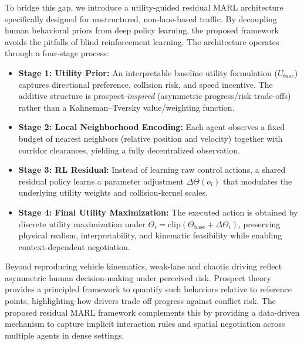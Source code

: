 \documentclass[conference]{IEEEtran}
\begin{document}
To bridge this gap, we introduce a utility-guided residual MARL architecture specifically designed for unstructured, non-lane-based traffic. By decoupling human behavioral priors from deep policy learning, the proposed framework avoids the pitfalls of blind reinforcement learning. The architecture operates through a four-stage process:

\begin{itemize}
    \item \textbf{Stage 1: Utility Prior:} An interpretable baseline utility formulation ($U_{base}$) captures directional preference, collision risk, and speed incentive. The additive structure is prospect-\emph{inspired} (asymmetric progress/risk trade-offs) rather than a Kahneman--Tversky value/weighting function.
    \item \textbf{Stage 2: Local Neighborhood Encoding:} Each agent observes a fixed budget of nearest neighbors (relative position and velocity) together with corridor clearances, yielding a fully decentralized observation.
    \item \textbf{Stage 3: RL Residual:} Instead of learning raw control actions, a shared residual policy learns a parameter adjustment $\Delta\Theta(o_{i})$ that modulates the underlying utility weights and collision-kernel scales.
    \item \textbf{Stage 4: Final Utility Maximization:} The executed action is obtained by discrete utility maximization under $\Theta_{i}=\mathrm{clip}(\Theta_{\mathrm{base}}+\Delta\Theta_{i})$, preserving physical realism, interpretability, and kinematic feasibility while enabling context-dependent negotiation.
\end{itemize}

Beyond reproducing vehicle kinematics, weak-lane and chaotic driving reflect asymmetric human decision-making under perceived risk. Prospect theory provides a principled framework to quantify such behaviors relative to reference points, highlighting how drivers trade off progress against conflict risk. The proposed residual MARL framework complements this by providing a data-driven mechanism to capture implicit interaction rules and spatial negotiation across multiple agents in dense settings.
\end{document}
